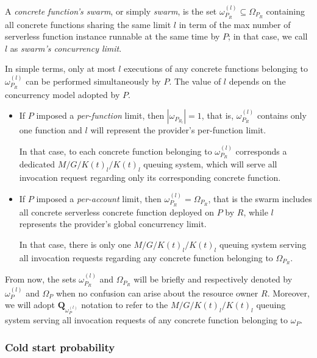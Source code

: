 \documentclass[12pt,a4paper]{report}
\begin{document}
A \textit{concrete function's swarm}, or simply \textit{swarm}, is the set $\omega_{P_R}^{(l)} \subseteq \Omega_{P_R}$ containing all concrete functions sharing the same limit $l$ in term of the max number of serverless function instance runnable at the same time by $P$; in that case, we call $l$ as \textit{swarm's concurrency limit}.

In simple terms, only at most $l$ executions of any concrete functions belonging to $\omega_{P_R}^{(l)}$ can be performed simultaneously by $P$. The value of $l$ depends on the concurrency model adopted by $P$. 

\begin{itemize}
	
	\item If $P$ imposed a \textit{per-function} limit, then $|\omega_{P_{R_l}}| = 1$, that is, $\omega_{P_R}^{(l)}$ contains only one function and $l$ will represent the provider's per-function limit. 
	
	In that case, to each concrete function belonging to $\omega_{P_R}^{(l)}$ corresponds a dedicated $M/G/K(t)_{l}/K(t)_{l}$ queuing system, which will serve all invocation request regarding only its corresponding concrete function.  
	
	\item If $P$ imposed a \textit{per-account} limit, then $\omega_{P_R}^{(l)} = \Omega_{P_R}$, that is the swarm includes all concrete serverless concrete function deployed on $P$ by $R$, while $l$ represents the provider's global concurrency limit. 
	
	In that case, there is only one $M/G/K(t)_{l}/K(t)_{l}$ queuing system serving all invocation requests regarding any concrete function belonging to $\Omega_{P_R}$. 

\end{itemize}

From now, the sets $\omega_{P_R}^{(l)}$ and $\Omega_{P_R}$ will be briefly and respectively denoted by $\omega_{P}^{(l)}$ and $\Omega_{P}$ when no confusion can arise about the resource owner $R$. Moreover, we will adopt $\textbf{Q}_{\omega_{P}^{(l)}}$ notation to refer to the $M/G/K(t)_{l}/K(t)_{l}$ queuing system serving all invocation requests of any concrete function belonging to $\omega_{P}$. 

\subsubsection{Cold start probability}
\end{document}
